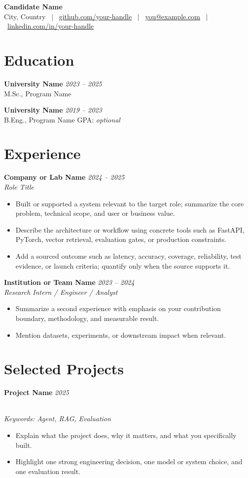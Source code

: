 \documentclass[a4paper,11pt]{extarticle}
\newcommand{\cvneedspace}[1]{%
  \par\ifdim\dimexpr\pagegoal-\pagetotal\relax<#1\relax\newpage\fi
}
\newcommand{\cvsection}[1]{\cvneedspace{4\baselineskip}\section{#1}}
\newcommand{\datedentry}[3]{%
  \cvneedspace{4\baselineskip}%
  \textbf{#1} \hfill \textit{#2}\\
  \textit{#3}
}
\newcommand{\projectentry}[2]{%
  \cvneedspace{4\baselineskip}%
  \textbf{#1} \hfill \textit{#2}
}
\newcommand{\projectkeywords}[1]{%
  \\[-1pt]{\footnotesize\textit{Keywords: #1}}
}
\begin{document}
\pagestyle{empty}

\begin{center}
  {\LARGE\bfseries Candidate Name} \\[4pt]
  {\small
    City, Country \ $|$ \
    \href{https://github.com/your-handle}{github.com/your-handle} \ $|$ \
    \href{mailto:you@example.com}{you@example.com} \ $|$ \
    \href{https://www.linkedin.com/in/your-handle}{linkedin.com/in/your-handle}
  }\\[-1pt]
\end{center}

\cvsection{Education}
\cvneedspace{3\baselineskip}
\textbf{University Name} \hfill \textit{2023 -- 2025}\\
M.Sc., Program Name

\cvneedspace{3\baselineskip}
\textbf{University Name} \hfill \textit{2019 -- 2023}\\
B.Eng., Program Name \hfill GPA: \textit{optional}

\cvsection{Experience}
\datedentry{Company or Lab Name}{2024 -- 2025}{Role Title}
\vspace{-0.6em}
{\small
\begin{itemize}
  \item Built or supported a system relevant to the target role; summarize the core problem, technical scope, and user or business value.
  \item Describe the architecture or workflow using concrete tools such as FastAPI, PyTorch, vector retrieval, evaluation gates, or production constraints.
  \item Add a sourced outcome such as latency, accuracy, coverage, reliability, test evidence, or launch criteria; quantify only when the source supports it.
\end{itemize}
}

\datedentry{Institution or Team Name}{2023 -- 2024}{Research Intern / Engineer / Analyst}
\vspace{-0.6em}
{\small
\begin{itemize}
  \item Summarize a second experience with emphasis on your contribution boundary, methodology, and measurable result.
  \item Mention datasets, experiments, or downstream impact when relevant.
\end{itemize}
}

\cvsection{Selected Projects}
\projectentry{Project Name}{2025}
\projectkeywords{Agent, RAG, Evaluation}
\vspace{-0.7em}
{\small
\begin{itemize}
  \item Explain what the project does, why it matters, and what you specifically built.
  \item Highlight one strong engineering decision, one model or system choice, and one evaluation result.
\end{itemize}
}
\end{document}
